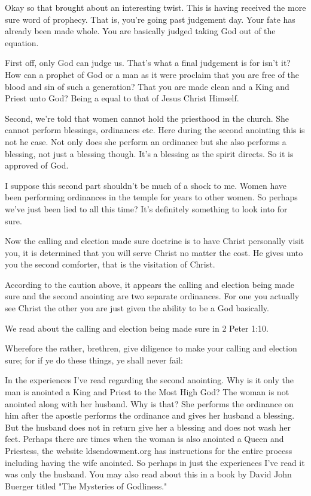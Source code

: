  Okay so that brought about an interesting twist. This is having received the 
 more sure word of prophecy. That is, you're going past judgement day. Your fate 
 has already been made whole. You are basically judged taking God out of the 
 equation.
 
 First off, only God can judge us. That's what a final judgement is for isn't 
 it? How can a prophet of God or a man as it were proclaim that you are free of 
 the blood and sin of such a generation? That you are made clean and a King and 
 Priest unto God? Being a equal to that of Jesus Christ Himself.
 
 Second, we're told that women cannot hold the priesthood in the church. She 
 cannot perform blessings, ordinances etc. Here during the second anointing this 
 is not he case. Not only does she perform an ordinance but she also performs a 
 blessing, not just a blessing though. It's a blessing as the spirit directs. 
 So it is approved of God.
 
 I suppose this second part shouldn't be much of a shock to me. Women have been 
 performing ordinances in the temple for years to other women. So perhaps we've 
 just been lied to all this time? It's definitely something to look into for 
 sure.
 
 Now the calling and election made sure doctrine is to have Christ personally 
 visit you, it is determined that you will serve Christ no matter the cost. He 
 gives unto you the second comforter, that is the visitation of Christ.
 
 According to the caution above, it appears the calling and election being made 
 sure and the second anointing are two separate ordinances. For one you actually 
 see Christ the other you are just given the ability to be a God basically.
 
 We read about the calling and election being made sure in 2 Peter 1:10.
 
 \begin{displayquote}
 Wherefore the rather, brethren, give diligence to make your calling and 
 election sure; for if ye do these things, ye shall never fail:
 \end{displayquote}
 
 In the experiences I've read regarding the second anointing. Why is it only the 
 man is anointed a King and Priest to the Most High God? The woman is not 
 anointed along with her husband. Why is that? She performs the ordinance on him 
 after the apostle performs the ordinance and gives her husband a blessing. But 
 the husband does not in return give her a blessing and does not wash her feet. 
 Perhaps there are times when the woman is also anointed a Queen and Priestess, 
 the website ldsendowment.org has instructions for the entire process including 
 having the wife anointed. So perhaps in just the experiences I've read it was 
 only the husband. You may also read about this in a book by David John Buerger 
 titled "The Mysteries of Godliness."

